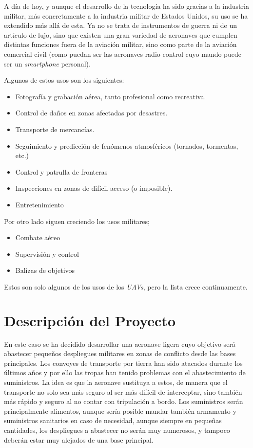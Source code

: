 A día de hoy, y aunque el desarrollo de la tecnología ha sido gracias a la industria militar, más concretamente a la industria militar de Estados Unidos, su uso se ha extendido más allá de esta. Ya no se trata de instrumentos de guerra ni de un artículo de lujo, sino que existen una gran variedad de aeronaves que cumplen distintas funciones fuera de la aviación militar, sino como parte de la aviación comercial civil (como puedan ser las aeronaves radio control cuyo mando puede ser un \emph{smartphone} personal).

Algunos de estos usos son los siguientes:

\begin{itemize}
	\item Fotografía y grabación aérea, tanto profesional como recreativa.
	\item Control de daños en zonas afectadas por desastres.
	\item Transporte de mercancías.
	\item Seguimiento y predicción de fenómenos atmosféricos (tornados, tormentas, etc.)
	\item Control y patrulla de fronteras
	\item Inspecciones en zonas de difícil acceso (o imposible).
	\item Entretenimiento
\end{itemize}

Por otro lado siguen creciendo los usos militares;

\begin{itemize}
	\item Combate aéreo
	\item Supervisión y control
	\item Balizas de objetivos
\end{itemize}

Estos son solo algunos de los usos de los \emph{UAVs}, pero la lista crece continuamente. 



\section{Descripción del Proyecto}

En este caso se ha decidido desarrollar una aeronave ligera cuyo objetivo será abastecer pequeños despliegues militares en zonas de conflicto desde las bases principales. Los convoyes de transporte por tierra han sido atacados durante los últimos años y por ello las tropas han tenido problemas con el abastecimiento de suministros. La idea es que la aeronave sustituya a estos, de manera que el transporte no solo sea más seguro al ser más difícil de interceptar, sino también más rápido y seguro al no contar con tripulación a bordo. 
Los suministros serán principalmente alimentos, aunque sería posible mandar también armamento y suministros sanitarios en caso de necesidad, aunque siempre en pequeñas cantidades, los despliegues a abastecer no serán muy numerosos, y tampoco deberán estar muy alejados de una base principal.

